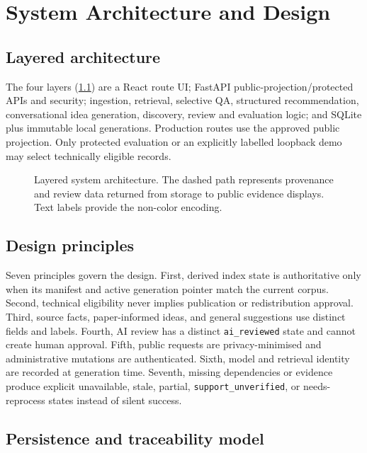 \chapter{System Architecture and Design}
\label{ch:architecture}

\section{Layered architecture}

The four layers (\cref{fig:thesis-architecture}) are a React route UI; FastAPI public-projection/protected APIs and security; ingestion, retrieval, selective QA, structured recommendation, conversational idea generation, discovery, review and evaluation logic; and SQLite plus immutable local generations. Production routes use the approved public projection. Only protected evaluation or an explicitly labelled loopback demo may select technically eligible records.

\begin{figure}[htbp]
\centering
\resizebox{0.96\textwidth}{!}{}
\caption[Layered system architecture and provenance return path.]{Layered system architecture. The dashed path represents provenance and review data returned from storage to public evidence displays. Text labels provide the non-color encoding.}
\label{fig:thesis-architecture}
\end{figure}

\section{Design principles}

Seven principles govern the design. First, derived index state is authoritative only when its manifest and active generation pointer match the current corpus. Second, technical eligibility never implies publication or redistribution approval. Third, source facts, paper-informed ideas, and general suggestions use distinct fields and labels. Fourth, AI review has a distinct \texttt{ai\_reviewed} state and cannot create human approval. Fifth, public requests are privacy-minimised and administrative mutations are authenticated. Sixth, model and retrieval identity are recorded at generation time. Seventh, missing dependencies or evidence produce explicit unavailable, stale, partial, \texttt{support\_unverified}, or needs-reprocess states instead of silent success.

\section{Persistence and traceability model}

